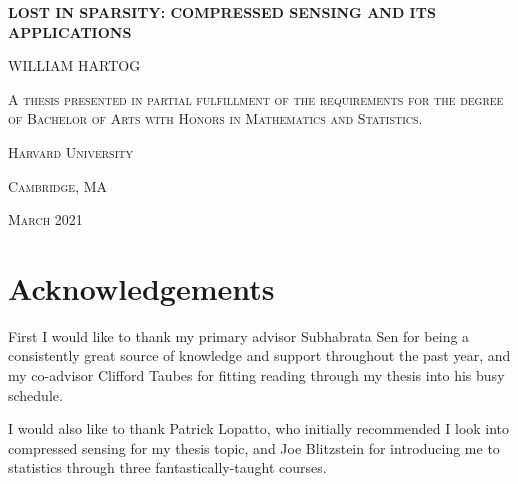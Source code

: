 \documentclass[12pt,a4paper]{amsart}
\title{}
\numberwithin{equation}{section}
\theoremstyle{plain}
\theoremstyle{definition}
\begin{document}
\begin{titlepage}


\begin{center}
\Large\bfseries\MakeUppercase{Lost in Sparsity: Compressed Sensing and its Applications}
\end{center}

\vskip 0.5in

\begin{center}
    \Medium\MakeUppercase{William Hartog}
\end{center}

\vskip 0.5in

\begin{center}
    
    
\end{center}

\vskip 2.5in

\begin{center}
    {\scshape A thesis presented in partial fulfillment of the requirements for the degree of Bachelor of Arts with Honors in Mathematics and Statistics.}
\end{center}

\vskip 0.5in

\begin{center}
    {\scshape Harvard University}
    
    {\scshape Cambridge, MA}
    
    {\scshape March 2021}
\end{center}

\end{titlepage}

\section*{Acknowledgements}

First I would like to thank my primary advisor Subhabrata Sen for being a consistently great source of knowledge and support throughout the past year, and my co-advisor Clifford Taubes for fitting reading through my thesis into his busy schedule.

I would also like to thank Patrick Lopatto, who initially recommended I look into compressed sensing for my thesis topic, and Joe Blitzstein for introducing me to statistics through three fantastically-taught courses.
\end{document}
